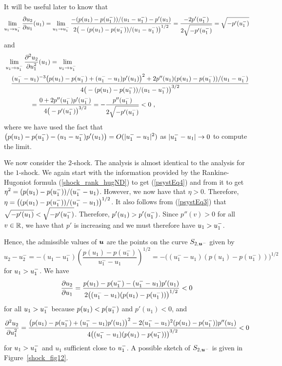 \begin{egg}
It will be useful later to know that
\[
\lim_{u_1 \to u^-_1} \frac{\partial{u_2}}{\partial u_1}(u_1) =
\lim_{u_1 \to u^-_1} \frac{-(p(u_1) - p(u^-_1))/(u_1-u^-_1) - p'(u_1)}
{2\big( -(p(u_1) - p(u^-_1))/(u_1-u^-_1) \big)^{1/2}} 
= \frac{-2p'(u^-_1)}{2\sqrt{-p'(u^-_1)}} = \sqrt{-p'(u^-_1)}
\]
and
\begin{align*}
&\lim_{u_1 \to u^-_1} \frac{\displaystyle \partial^{2}{u_2}} {\displaystyle \partial u_1^{2}}(u_1)
=\lim_{u_1 \to u^-_1} \\
&\quad \frac{(u^-_1 -u_1)^{-3}\big(p(u_1) - p(u^-_1) +(u^-_1-u_1) p'(u_1)\big)^2
+ 2 p''(u_1) (p(u_1)-p(u^-_1))/(u_1-u^-_1)}
{4\big(-(p(u_1) - p(u^-_1))/(u_1 - u^-_1)\big)^{3/2}} \\
&\qquad \qquad
= \frac{0  + 2 p''(u^-_1) p'(u^-_1)}{4 \big(-p'(u^-_1)\big)^{3/2}}
= -\frac{p''(u^-_1)}{2 \sqrt{-p'(u^-_1)}} < 0 \ ,
\end{align*}
where we have used the fact that
$\displaystyle \big(p(u_1) - p(u^-_1) - (u_1-u^-_1) p'(u_1)\big)
= O(|u^-_1-u_1|^2)$ as
$\displaystyle |u^-_1 - u_1| \to 0$ to compute the limit.


 We now consider the $2$-shock.  The analysis is almost
identical to the analysis for the $1$-shock.  We again start with the
information provided by the Rankine-Hugoniot formula
(\ref{shock_rank_hugND}) to get (\ref{psystEq4}) and from it
to get $\displaystyle \eta^2 = (p(u_1) - p(u^-_1))/(u^-_1 - u_1)$.
However, we now have that $\eta > 0$.  Therefore,
$\displaystyle \eta = \big((p(u_1) - p(u^-_1))/(u^-_1 - u_1)\big)^{1/2}$.
It also follows from (\ref{psystEq3}) that
$\displaystyle \sqrt{-p'(u_1)} < \sqrt{-p'(u^-_1)}$.  Therefore,
$\displaystyle p'(u_1) > p'(u^-_1)$.  Since $p''(v) > 0$ for all
$v \in \mathbb{R}$, we have that $p'$ is increasing and we must therefore have
$\displaystyle u_1 > u^-_1$.

Hence, the admissible values of ${\bm{u}}$ are the points on the curve
$S_{2,{\bm{u}}^-}$ given by
\[
u_2 - u^-_2 = -( u_1 - u^-_1)
\left(\frac{p(u_1) - p(u^-_1)}{u^-_1 - u_1}\right)^{1/2}
= - \big( (u^-_1 - u_1) (p(u_1) - p(u^-_1)) \big)^{1/2}
\]
for $\displaystyle u_1 > u^-_1$.  We have
\[
\frac{\partial{u_2}}{\partial u_1} = \frac{p(u_1) - p(u^-_1) - (u^-_1 - u_1)p'(u_1)}
{2\big( (u^-_1 - u_1) (p(u_1) - p(u^-_1)) \big)^{1/2}} < 0
\]
for all $\displaystyle u_1 > u^-_1$ because
$\displaystyle p(u_1) < p(u^-_1)$ and $p'(u_1)<0$, and
\[
\frac{\displaystyle \partial^{2}{u_2}} {\displaystyle \partial u_1^{2}} = 
\frac{\big(p(u_1) - p(u^-_1) + (u^-_1 - u_1)p'(u_1)\big)^2
- 2 (u^-_1-u_1)^2 (p(u_1) - p(u^-_1)) p''(u_1)}
{4\big((u^-_1 - u_1)(p(u_1)-p(u^-_1))\big)^{3/2}}
< 0
\]
for $\displaystyle u_1 > u^-_1$ and $u_1$ sufficient close to
$\displaystyle u^-_1$.  A possible
sketch of $S_{2,{\bm{u}}^-}$ is given in Figure~\ref{shock_fig12}.


\end{egg}
